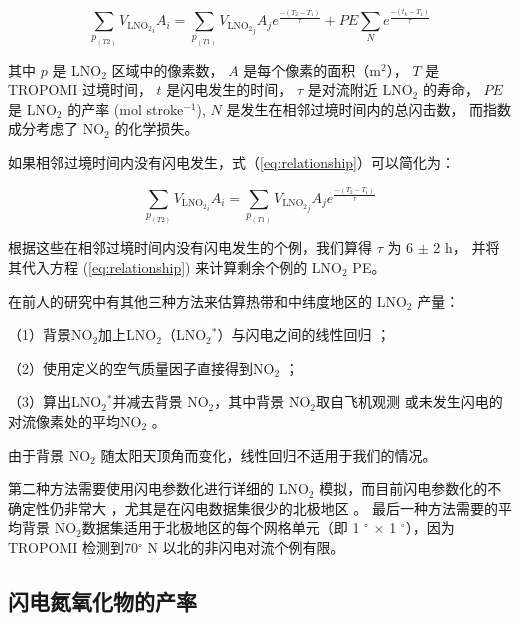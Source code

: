 \begin{equation} \label{eq:relationship}
\sum_{p_{(T2)}} V_{\textrm{LNO$_2$}_{i}} A_{i} = \sum_{p_{(T1)}} V_{\textrm{LNO$_2$}_{j}} A_{j} e^\frac{{-(T_2-T_1)}}{\tau} + PE \sum_{N} e^\frac{{-(t_k-T_1)}}{\tau}
\end{equation}

其中 $p$ 是 LNO$_2$ 区域中的像素数，
$A$ 是每个像素的面积（m$^2$），
$T$ 是 TROPOMI 过境时间，
$t$ 是闪电发生的时间，
$\tau$ 是对流附近 LNO$_2$ 的寿命，
$PE$ 是 LNO$_2$ 的产率 (mol stroke$^{-1}$),
$N$ 是发生在相邻过境时间内的总闪击数，
而指数成分考虑了 NO$_2$ 的化学损失。

如果相邻过境时间内没有闪电发生，式（\ref{eq:relationship}）可以简化为：

\begin{equation} \label{eq:LNO2_nolightning}
\sum_{p_{(T2)}} V_{\textrm{LNO$_2$}_{i}} A_{i} = \sum_{p_{(T1)}} V_{\textrm{LNO$_2$}_{j}} A_{j} e^\frac{{-(T_2-T_1)}}{\tau}
\end{equation}

根据这些在相邻过境时间内没有闪电发生的个例，我们算得 $\tau$ 为 6 $\pm$ 2 h，
并将其代入方程 (\ref{eq:relationship}) 来计算剩余个例的 LNO$_2$ PE。

在前人的研究中有其他三种方法来估算热带和中纬度地区的 LNO$_2$ 产量：

（1）背景NO$_2$加上LNO$_2$（LNO$_2$$^*$）与闪电之间的线性回归 \citep{Pickering.2016,Allen.2019,Lapierre.2020}；

（2）使用定义的空气质量因子直接得到NO$_2$ \citep{Beirle.2009,Zhang.2020b,Zhang.2022a}；

（3）算出LNO$_2$$^*$并减去背景 NO$_2$，其中背景 NO$_2$取自飞机观测 \cite{Pickering.2016,Perez-Invernon.2022} 或未发生闪电的对流像素处的平均NO$_2$ \citep{Bucsela.2019,Bucsela.2010,Allen.2021a}。

由于背景 NO$_2$ 随太阳天顶角而变化，线性回归不适用于我们的情况。

第二种方法需要使用闪电参数化进行详细的 LNO$_2$ 模拟，而目前闪电参数化的不确定性仍非常大 \cite{Finney.2018,Romps.2019,Chen.2021a}，尤其是在闪电数据集很少的北极地区 \citep{Holzworth.2021}。
最后一种方法需要的平均背景 NO$_2$数据集适用于北极地区的每个网格单元（即 1 $^{\circ}$ $\times$ 1 $^{\circ}$），因为 TROPOMI 检测到70$^{\circ}$ N 以北的非闪电对流个例有限。


\subsection{闪电氮氧化物的产率}


